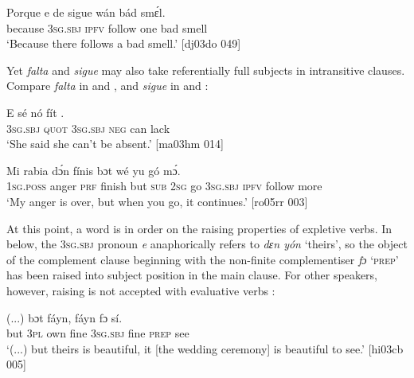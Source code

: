 \ea%
    \label{ex:key:1149}
    \gll Porque  e    de  sigue  wán  bád  smɛ́l.\\
because  \textsc{3sg.sbj}  \textsc{ipfv}  follow  one  bad  smell\\

\glt ‘Because there follows a bad smell.’   [dj03do 049]
\z

Yet \textit{falta} and \textit{sigue} may also take referentially full subjects in intransitive clauses. Compare \textit{falta} in  and , and \textit{sigue} in  and :


\ea%
    \label{ex:key:1150}
    \gll \textsc{E}    sé        nó  fít    .\\
\textsc{3sg.sbj}  \textsc{quot}    \textsc{3sg.sbj}  \textsc{neg}  can    lack\\

\glt ‘She said she can’t be absent.’ [ma03hm 014]
\z


\ea%
    \label{ex:key:1151}
    \gll Mi    rabia  dɔ́n  fínis    bɔt  wé  yu  gó
        mɔ́.\\
\textsc{1sg.poss}  anger  \textsc{prf}  finish  but  \textsc{sub}  \textsc{2sg}  go
\textsc{3sg.sbj}  \textsc{ipfv}  follow  more\\

\glt ‘My anger is over, but when you go, it continues.’ [ro05rr 003]
\z

At this point, a word is in order on the raising properties of expletive verbs. In  below, the \textsc{3sg.sbj} pronoun \textit{e} anaphorically refers to \textit{dɛn yón} ‘theirs’, so the object of the complement clause beginning with the non-finite complementiser \textit{fɔ} ‘\textsc{prep}’ has been raised into subject position in the main clause. For other speakers, however, raising is not accepted with evaluative verbs : 


\ea%
    \label{ex:key:1152}
    \gll (...)  bɔt         fáyn,      fáyn    fɔ  sí.\\
  {} but  \textsc{3pl}  own    fine    \textsc{3sg.sbj}  fine    \textsc{prep}  see\\

\glt ‘(...) but theirs is beautiful, it [the wedding ceremony] is beautiful to see.’ [hi03cb 005]
\z


